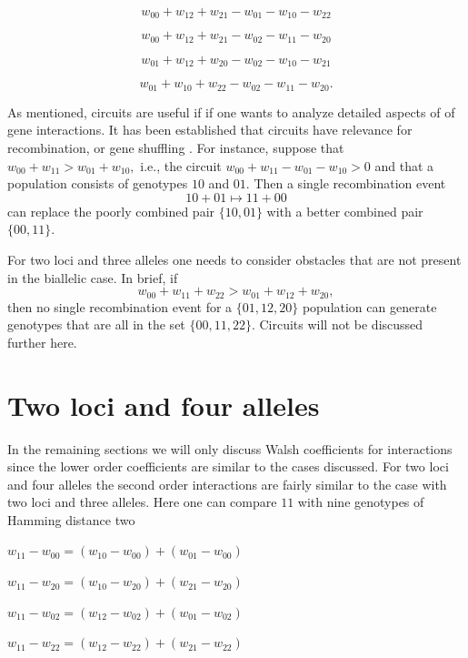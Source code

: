 \documentclass[12pt]{amsart}
\theoremstyle{plain}
\theoremstyle{definition}
\begin{document}
\[
w_{00}+w_{12}+w_{21}-w_{01}-w_{10}-w_{22}
\]




\[
w_{00}+w_{12}+w_{21}-w_{02}-w_{11}-w_{20} 
\]





\[
w_{01}+w_{12}+w_{20}-w_{02}-w_{10}-w_{21} 
\]





\[
w_{01}+w_{10}+w_{22}-w_{02}-w_{11}-w_{20}.
\]



As mentioned, circuits are useful if
if one wants to analyze detailed aspects of
of gene interactions.
It has been established that
circuits have relevance for
recombination, or gene shuffling \citep{bps}.
For instance, suppose that
$
w_{00}+w_{11}>w_{01}+w_{10},
$
i.e., the circuit 
$
w_{00}+w_{11}-w_{01}-w_{10}>0
$
and that a population consists of
genotypes $10$ and $01$.
Then a single recombination event
\[
10+01 \mapsto 11+00
\]
can replace the poorly combined pair 
$\{ 10, 01 \}$ with a better
combined pair $\{00, 11 \}$.

For two loci and three alleles 
one needs to consider obstacles
that are not present in the biallelic
case.
In brief, if
\[
w_{00}+w_{11}+w_{22}>w_{01}+w_{12}+w_{20},
\]
then no single recombination event
for a $\{01, 12, 20\}$ population can
generate genotypes that are all
in the set $\{00, 11, 22\}$.
Circuits will not be discussed further here.


\newpage


\section{Two loci and four alleles}
In the remaining sections we will 
only discuss Walsh coefficients for interactions
since the lower order coefficients
are similar to the cases discussed.
For two loci and four alleles the
second order interactions 
are fairly similar to the case with 
two loci and three alleles.
Here one can compare $11$ with 
nine genotypes of Hamming distance two

\smallskip

$
w_{11}-w_{00}= (w_{10}-w_{00}) +(w_{01}-w_{00})
$


$
w_{11}-w_{20}= (w_{10}-w_{20}) +(w_{21}-w_{20})
$


$
w_{11}-w_{02}= (w_{12}-w_{02}) +(w_{01}-w_{02})
$



$
w_{11}-w_{22}= (w_{12}-w_{22}) +(w_{21}-w_{22})
$
\end{document}
